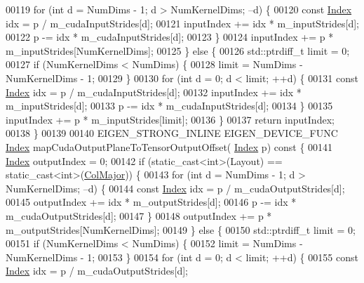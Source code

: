 \begin{DoxyCode}
00119       \textcolor{keywordflow}{for} (\textcolor{keywordtype}{int} d = NumDims - 1; d > NumKernelDims; --d) \{
00120         \textcolor{keyword}{const} \hyperlink{namespace_eigen_a62e77e0933482dafde8fe197d9a2cfde}{Index} idx = p / m\_cudaInputStrides[d];
00121         inputIndex += idx * m\_inputStrides[d];
00122         p -= idx * m\_cudaInputStrides[d];
00123       \}
00124       inputIndex += p * m\_inputStrides[NumKernelDims];
00125     \} \textcolor{keywordflow}{else} \{
00126       std::ptrdiff\_t limit = 0;
00127       \textcolor{keywordflow}{if} (NumKernelDims < NumDims) \{
00128         limit = NumDims - NumKernelDims - 1;
00129       \}
00130       \textcolor{keywordflow}{for} (\textcolor{keywordtype}{int} d = 0; d < limit; ++d) \{
00131         \textcolor{keyword}{const} \hyperlink{namespace_eigen_a62e77e0933482dafde8fe197d9a2cfde}{Index} idx = p / m\_cudaInputStrides[d];
00132         inputIndex += idx * m\_inputStrides[d];
00133         p -= idx * m\_cudaInputStrides[d];
00134       \}
00135       inputIndex += p * m\_inputStrides[limit];
00136     \}
00137     \textcolor{keywordflow}{return} inputIndex;
00138   \}
00139 
00140   EIGEN\_STRONG\_INLINE EIGEN\_DEVICE\_FUNC \hyperlink{namespace_eigen_a62e77e0933482dafde8fe197d9a2cfde}{Index} mapCudaOutputPlaneToTensorOutputOffset(
      \hyperlink{namespace_eigen_a62e77e0933482dafde8fe197d9a2cfde}{Index} p)\textcolor{keyword}{ const }\{
00141     \hyperlink{namespace_eigen_a62e77e0933482dafde8fe197d9a2cfde}{Index} outputIndex = 0;
00142     \textcolor{keywordflow}{if} (static\_cast<int>(Layout) == static\_cast<int>(\hyperlink{group__enums_ggaacded1a18ae58b0f554751f6cdf9eb13a0cbd4bdd0abcfc0224c5fcb5e4f6669a}{ColMajor})) \{
00143       \textcolor{keywordflow}{for} (\textcolor{keywordtype}{int} d = NumDims - 1; d > NumKernelDims; --d) \{
00144         \textcolor{keyword}{const} \hyperlink{namespace_eigen_a62e77e0933482dafde8fe197d9a2cfde}{Index} idx = p / m\_cudaOutputStrides[d];
00145         outputIndex += idx * m\_outputStrides[d];
00146         p -= idx * m\_cudaOutputStrides[d];
00147       \}
00148       outputIndex += p * m\_outputStrides[NumKernelDims];
00149     \} \textcolor{keywordflow}{else} \{
00150       std::ptrdiff\_t limit = 0;
00151       \textcolor{keywordflow}{if} (NumKernelDims < NumDims) \{
00152         limit = NumDims - NumKernelDims - 1;
00153       \}
00154       \textcolor{keywordflow}{for} (\textcolor{keywordtype}{int} d = 0; d < limit; ++d) \{
00155         \textcolor{keyword}{const} \hyperlink{namespace_eigen_a62e77e0933482dafde8fe197d9a2cfde}{Index} idx = p / m\_cudaOutputStrides[d];

\end{DoxyCode}
